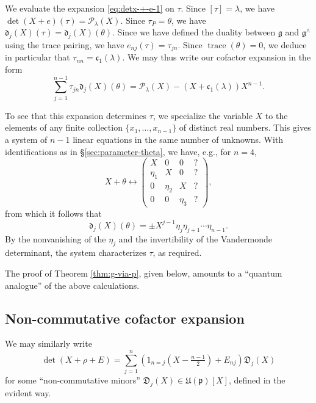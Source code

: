 \documentclass[reqno]{amsart}
\DeclareMathOperator{\trace}{trace}
\DeclareMathOperator{\Sym}{Sym}
\theoremstyle{plain} \newtheorem{theorem} {Theorem}
\theoremstyle{definition} \newtheorem{definition} [theorem] {Definition}
\theoremstyle{itplain} %
\numberwithin{equation}{section}
\numberwithin{theorem}{section}
\begin{document}

We evaluate the expansion \eqref{eq:detx-+-e-1} on $\tau$.  Since $[\tau] = \lambda$, we have $\det(X + e)(\tau) = \mathcal{P}_\lambda(X)$.  Since $\tau_P = \theta$, we have $\mathfrak{d}_j(X)(\tau) = \mathfrak{d}_j(X)(\theta)$.  Since we have defined the duality between $\mathfrak{g}$ and $\mathfrak{g}^\wedge$ using the trace pairing, we have $e_{n j}(\tau) = \tau_{j n}$.  Since $\trace(\theta) = 0$, we deduce in particular that $\tau_{n n} = \mathfrak{c}_1(\lambda)$.  We may thus write our cofactor expansion in the form
\[
  \sum _{j=1}^{n-1} \tau_{j n} \mathfrak{d}_j(X)(\theta) = \mathcal{P}_\lambda(X) - (X + \mathfrak{c}_1(\lambda)) X^{n-1}.
\]

To see that this expansion determines $\tau$, we specialize the variable $X$ to the elements of any finite collection $\{x_1,\dotsc,x_{n-1}\}$ of distinct real numbers.  This gives a system of $n-1$ linear equations in the same number of unknowns.  With identifications as in \S\ref{sec:parameter-theta}, we have, e.g., for $n=4$,
\begin{equation*}
  X + \theta
  \leftrightarrow
    \begin{pmatrix}
      X & 0 & 0 & ? \\
    \eta_1  & X  & 0 & ? \\
    0 & \eta_2  & X & ? \\
    0 & 0 & \eta_3  & ?
  \end{pmatrix},
\end{equation*}
from which it follows that
\begin{equation}\label{eqn:frak-d-j-X-tau}
  \mathfrak{d}_j(X)(\theta)
  =
  \pm
  X^{j-1}
  \eta_j \eta_{j+1} \dotsb \eta_{n-1}.
\end{equation}
By the nonvanishing of the $\eta_j$ and the invertibility of the Vandermonde determinant, the system characterizes $\tau$, as required.

The proof of Theorem \ref{thm:g-via-p}, given below, amounts to a ``quantum analogue'' of the above calculations.

\subsection{Non-commutative
  cofactor expansion}
We may similarly write
\begin{equation}\label{eqn:non-comm-cofactor}
  \det(X + \rho + E)
  =
  \sum_{j=1}^n
  \left(1_{n=j}
    \left(X
      - \tfrac{n-1}{2} \right)
    +
    E_{n j} \right)
  \mathfrak{D}_j(X)
\end{equation}
for some ``non-commutative minors'' $\mathfrak{D}_j(X) \in \mathfrak{U}(\mathfrak{p})[X]$, defined in the evident way.
\end{document}
